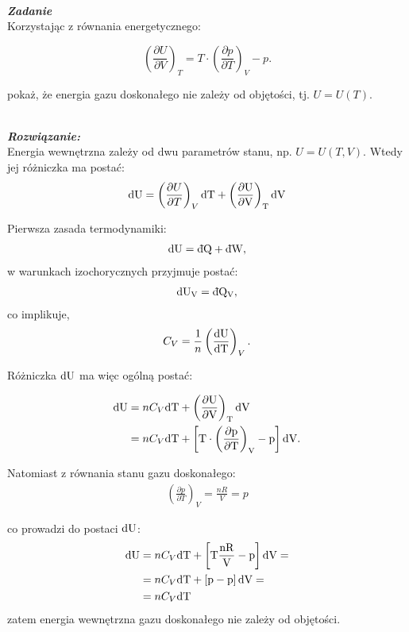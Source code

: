 \documentclass[11pt,a4paper]{article}
\newcounter{zadanie}\newcommand{\zadanie}[1][]{\addtocounter{zadanie}{1} ~\\  {\bf \emph{Zadanie \arabic{zadanie} #1 }} \\}
\newcounter{rozwiazanie}\newcommand{\rozwiazanie}[1][]{\addtocounter{rozwiazanie}{1} ~\\  {\bf \emph{Rozwiązanie: }} \\}
\newcommand{\dbar}{{\mkern3mu\mathchar'26\mkern-12mu d}}
\begin{document}
\newpage
 
\zadanie
Korzystając z równania energetycznego:

\[ \left(\frac{\partial U}{\partial V}\right)_T = 
T \cdot \left(\frac{\partial p}{\partial T}\right)_V - p.\]

pokaż, że energia gazu doskonałego nie zależy od objętości, tj. $U=U(T)$.

\vspace{5mm}
\rozwiazanie

Energia wewnętrzna zależy od dwu parametrów stanu, np. $U = U(T, V)$. Wtedy jej różniczka ma postać:
\begin{align}
  \rm{d} U &= \left(\frac{\partial U}{\partial T} \right)_V \rm{d}T  + \left(\frac{\partial U}{\partial V} \right)_T \rm{d}V \\
\end{align}

Pierwsza zasada termodynamiki:
\begin{align}
\rm{d}U = \rm{\dbar}Q + \rm{\dbar}W,
\end{align}
w warunkach izochorycznych przyjmuje postać:
\begin{align}
\rm{d}U_V = \rm{\dbar}Q _V, 
\end{align}
co implikuje,
\begin{align}
C_V = \frac{1}{n}\left( \frac{\rm{d}U}{\rm{d}T}\right)_V.
\end{align}

Różniczka $\rm{d}U$ ma więc ogólną postać:

\begin{align}
  \rm{d} U &= n C_V \rm{d}T + \left(\frac{\partial U}{\partial V} \right)_T \rm{d}V \\
 &= n C_V \rm{d}T + \left[    T \cdot \left(\frac{\partial p}{\partial T}\right)_V - p\right] \rm{d}V.
\end{align}

 Natomiast z równania stanu gazu doskonałego: 
 \begin{align}
 \left(\frac{\partial p}{\partial T}\right)_V  = \frac{nR}{V} = p
 \end{align}
 
 co prowadzi do postaci $\rm{d} U$:
 \begin{align}
  \rm{d} U &= n C_V \rm{d}T + \left[T\frac{nR}{V} - p\right] \rm{d}V = \\
  &= n C_V \rm{d}T + \left[p - p\right] \rm{d}V = \\
  &= n C_V \rm{d}T
\end{align}  
 zatem energia wewnętrzna gazu doskonałego nie zależy od objętości.
\end{document}
